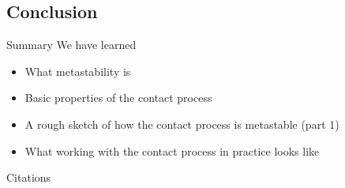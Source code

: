 \documentclass{beamer}
\begin{document}
\subsection{Conclusion}

\begin{frame}{Summary}
  We have learned
  \begin{itemize}
          \pause
    \item What metastability is
          \pause
    \item Basic properties of the contact process
          \pause
    \item A rough sketch of how the contact process is metastable (part 1)
          \pause
    \item What working with the contact process in practice looks like
  \end{itemize}
\end{frame}

\begin{frame}{Citations}
  \printbibliography
\end{frame}
\end{document}
